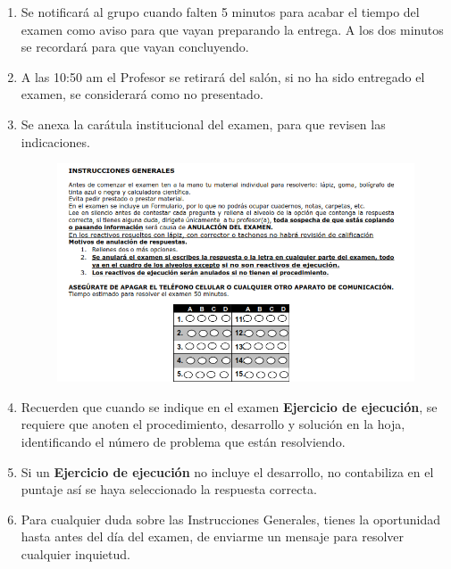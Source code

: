 \documentclass[14pt]{extarticle}
\begin{document}
\begin{enumerate}
\item Se notificará al grupo cuando falten 5 minutos para acabar el tiempo del examen como aviso para que vayan preparando la entrega. A los dos minutos se recordará para que vayan concluyendo.
\item A las 10:50 am el Profesor se retirará del salón, si no ha sido entregado el examen, se considerará como no presentado.
\item Se anexa la carátula institucional del examen, para que revisen las indicaciones.
\begin{figure}[H]
    \centering
    \includegraphics[scale=0.9]{Imagenes/Instrucciones_Examen.png}
\end{figure}
\item Recuerden que cuando se indique en el examen \textbf{Ejercicio de ejecución}, se requiere que anoten el procedimiento, desarrollo y solución en la hoja, identificando el número de problema que están resolviendo.
\item Si un \textbf{Ejercicio de ejecución} no incluye el desarrollo, no contabiliza en el puntaje así se haya seleccionado la respuesta correcta.
\item Para cualquier duda sobre las Instrucciones Generales, tienes la oportunidad hasta antes del día del examen, de enviarme un mensaje para resolver cualquier inquietud.
\end{enumerate}
\end{document}
